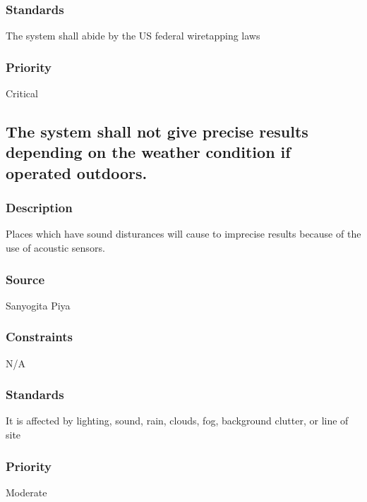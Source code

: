 \subsubsection{Standards}
The system shall abide by the US federal wiretapping laws
\subsubsection{Priority}
Critical

\subsection{The system shall not give precise results depending on the weather condition if operated outdoors.}
\subsubsection{Description}
Places which have sound disturances will cause to imprecise results because of the use of acoustic sensors.
\subsubsection{Source}
Sanyogita Piya
\subsubsection{Constraints}
N/A
\subsubsection{Standards}
It is affected by lighting, sound, rain, clouds, fog, background clutter, or line of site
\subsubsection{Priority}
Moderate

